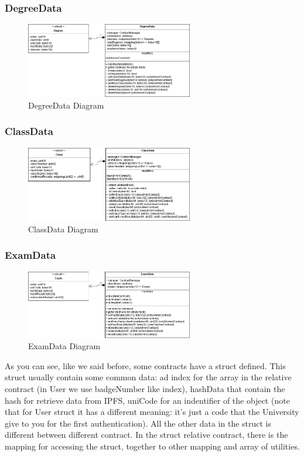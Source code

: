 \subsubsection{DegreeData}
\begin{figure}[!h]
	\centering
	\includegraphics[width=0.65\textwidth]{img/Contracts/DegreeData.png}
	\caption{DegreeData Diagram}
\end{figure}
\subsubsection{ClassData}
\begin{figure}[!h]
	\centering
	\includegraphics[width=0.65\textwidth]{img/Contracts/ClassData.png}
	\caption{ClassData Diagram}
\end{figure}
\subsubsection{ExamData}
\begin{figure}[!h]
	\centering
	\includegraphics[width=0.65\textwidth]{img/Contracts/ExamData.png}
	\caption{ExamData Diagram}
\end{figure}
As you can see, like we said before, some contracts have a struct defined. This struct usually contain some common data: ad index for the array in the relative contract (in User we use badgeNumber like index), hashData that contain the hash for retrieve data from IPFS, uniCode for an indentifier of the object (note that for User struct it has a different meaning: it's just a code that the University give to you for the first authentication). All the other data in the struct is different between different contract. In the struct relative contract, there is the mapping for accessing the struct, together to other mapping and array of utilities.


